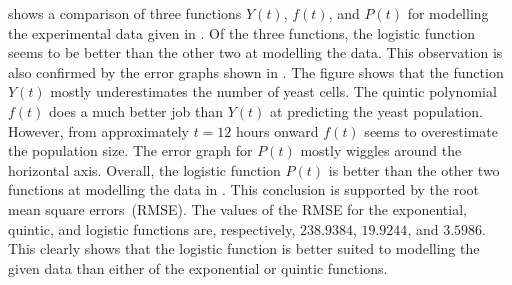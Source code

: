 \documentclass[a4paper,oneside,12pt]{article}
\begin{document}
\begin{problem}
{\begin{solution}
 shows a comparison
of three functions $Y(t)$, $f(t)$, and $P(t)$ for modelling the
experimental data given in .  Of the
three functions, the logistic function seems to be better than the
other two at modelling the data.  This observation is also confirmed
by the error graphs shown in
.  The figure shows that
the function $Y(t)$ mostly underestimates the number of yeast cells.
The quintic polynomial $f(t)$ does a much better job than $Y(t)$ at
predicting the yeast population.  However, from approximately $t = 12$
hours onward $f(t)$ seems to overestimate the population size.  The
error graph for $P(t)$ mostly wiggles around the horizontal axis.
Overall, the logistic function $P(t)$ is better than the other two
functions at modelling the data in .
This conclusion is supported by the root mean square errors~(RMSE).
The values of the RMSE for the exponential, quintic, and logistic
functions are, respectively, $238.9384$, $19.9244$, and $3.5986$.
This clearly shows that the logistic function is better suited to
modelling the given data than either of the exponential or quintic
functions.
\end{solution}
}{}


\end{problem}
\end{document}

